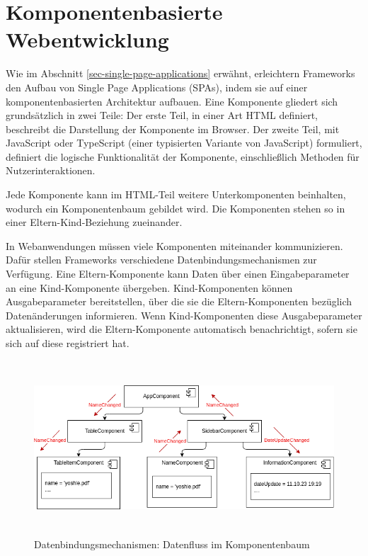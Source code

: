 \documentclass[12pt]{book}          %
\begin{document}
\section{Komponentenbasierte Webentwicklung}
\label{sec-komponentenbasierte-webentwicklung}

Wie im Abschnitt \ref{sec-single-page-applications} erwähnt, erleichtern Frameworks den Aufbau von Single Page Applications (SPAs), indem sie auf einer komponentenbasierten Architektur aufbauen. Eine Komponente gliedert sich grundsätzlich in zwei Teile: Der erste Teil, in einer Art HTML definiert, beschreibt die Darstellung der Komponente im Browser. Der zweite Teil, mit JavaScript oder TypeScript (einer typisierten Variante von JavaScript) formuliert, definiert die logische Funktionalität der Komponente, einschließlich Methoden für Nutzerinteraktionen.

Jede Komponente kann im HTML-Teil weitere Unterkomponenten beinhalten, wodurch ein Komponentenbaum gebildet wird. Die Komponenten stehen so in einer Eltern-Kind-Beziehung zueinander.

In Webanwendungen müssen viele Komponenten miteinander kommunizieren. Dafür stellen Frameworks verschiedene Datenbindungsmechanismen zur Verfügung. Eine Eltern-Komponente kann Daten über einen Eingabeparameter an eine Kind-Komponente übergeben. Kind-Komponenten können Ausgabeparameter bereitstellen, über die sie die Eltern-Komponenten bezüglich Datenänderungen informieren. Wenn Kind-Komponenten diese Ausgabeparameter aktualisieren, wird die Eltern-Komponente automatisch benachrichtigt, sofern sie sich auf diese registriert hat.

\begin{figure}[htbp]
\centering
\includegraphics[height=6.5cm]{abbildungen/components-sync-data-binding.png}
\caption{Datenbindungsmechanismen: Datenfluss im Komponentenbaum}
\label{components-sync-data-binding}
\end{figure}
\end{document}
